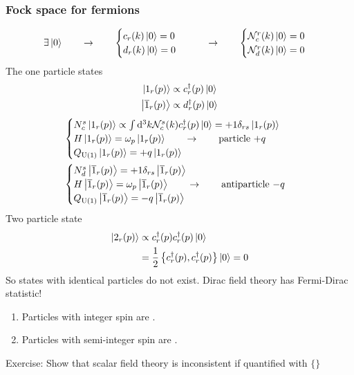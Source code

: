 \subsubsection{Fock space for fermions}
\[ \exists\left| 0 \right\rangle \qquad \to \qquad \begin{cases}
c_r(k)\left| 0 \right\rangle = 0 \\ d_r(k)\left| 0 \right\rangle = 0
\end{cases} \qquad \to \qquad \begin{cases}
\mathcal{N}_c^r(k)\left| 0 \right\rangle = 0 \\ \mathcal{N}_d^r(k)\left| 0 \right\rangle = 0
\end{cases} \]
The one particle states
\begin{align*}
\left| 1_r(p) \right\rangle &\propto c_r^\dagger(p)\left| 0 \right\rangle \\
\left| \overline{1}_r(p) \right\rangle &\propto d_r^\dagger(p)\left| 0 \right\rangle
\end{align*}
\begin{align*}
& \begin{cases}
N_c^s\left| 1_r(p) \right\rangle \propto \int \operatorname{d \!}{^3k}\mathcal{N}_c^s(k)c_r^\dagger(p)\left| 0 \right\rangle = +1\delta_{rs}\left| 1_r(p) \right\rangle \\
H\left| 1_r(p) \right\rangle = \omega_p\left| 1_r(p) \right\rangle \qquad \to \qquad \text{particle $+q$} \\
Q_{\operatorname{U}(1)}\left| 1_r(p) \right\rangle = +q\left| 1_r(p) \right\rangle
\end{cases} \\
& \begin{cases}
N_d^s\left| \overline{1}_r(p) \right\rangle = +1\delta_{rs}\left| \overline{1}_r(p) \right\rangle \\
H\left| \overline{1}_r(p) \right\rangle = \omega_p\left| \overline{1}_r(p) \right\rangle \qquad \to \qquad \text{antiparticle $-q$} \\
Q_{\operatorname{U}(1)}\left| \overline{1}_r(p) \right\rangle = -q\left| \overline{1}_r(p) \right\rangle
\end{cases}
\end{align*}
Two particle state
\begin{align*}
\left| 2_r(p) \right\rangle &\propto c_r^\dagger(p)c_r^\dagger(p)\left| 0 \right\rangle \\
&= \frac{1}{2}\left\{c_r^\dagger(p), c_r^\dagger(p)\right\}\left| 0 \right\rangle = 0
\end{align*}
So states with identical particles do not exist. Dirac field theory has Fermi-Dirac statistic!

\begin{eigenschap}
\begin{enumerate}
\item Particles with integer spin are .
\item Particles with semi-integer spin are .
\end{enumerate}
\end{eigenschap}
\begin{example}
Exercise: Show that scalar field theory is inconsistent if quantified with $\{\}$
\end{example}

